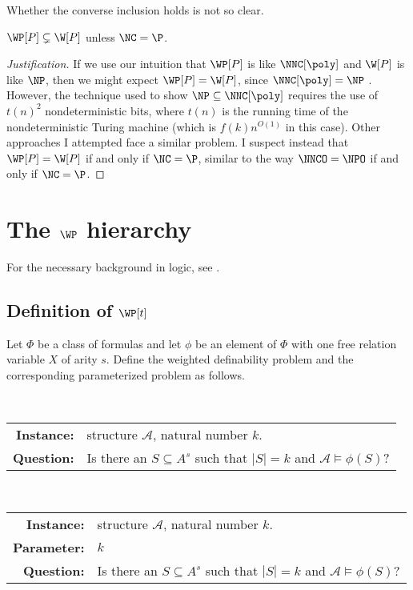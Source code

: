 \documentclass{article}
\newenvironment{justification}{\begin{proof}[Justification]}{\end{proof}}
\begin{document}
Whether the converse inclusion holds is not so clear.

\begin{conjecture}
  $\WP[P] \subsetneq \W[P]$ unless $\NC = \P$.
\end{conjecture}
\begin{justification}
  If we use our intuition that $\WP[P]$ is like $\NNC[\poly]$ and $\W[P]$ is like $\NP$, then we might expect $\WP[P] = \W[P]$, since $\NNC[\poly] = \NP$ \autocite[Theorem~2.2]{wolf94}.
  However, the technique used to show $\NP \subseteq \NNC[\poly]$ requires the use of $t(n)^2$ nondeterministic bits, where $t(n)$ is the running time of the nondeterministic Turing machine (which is $f(k) n^{O(1)}$ in this case).
  Other approaches I attempted face a similar problem.
  I suspect instead that $\WP[P] = \W[P]$ if and only if $\NC = \P$, similar to the way $\NNCO = \NPO$ \autocite{ncapproximation} if and only if $\NC = \P$.
\end{justification}

\section{The \texorpdfstring{$\WP$}{WP} hierarchy}

For the necessary background in logic, see \autocite[Chapter~4]{fg06}.

\subsection{Definition of \texorpdfstring{$\WP[t]$}{WP[t]}}

Let $\Phi$ be a class of formulas and let $\phi$ be an element of $\Phi$ with one free relation variable $X$ of arity $s$.
Define the weighted definability problem and the corresponding parameterized problem as follows.

\begin{definition}
  \mbox{} \\
  \begin{tabular}{r p{9.2cm}}
    \textbf{Instance:} & structure $\mathcal{A}$, natural number $k$. \\
    \textbf{Question:} & Is there an $S \subseteq A^s$ such that $|S| = k$ and $\mathcal{A} \models \phi(S)$?
  \end{tabular}
\end{definition}

\begin{definition}
  \mbox{} \\
  \begin{tabular}{r p{9.2cm}}
    \textbf{Instance:} & structure $\mathcal{A}$, natural number $k$. \\
    \textbf{Parameter:} & $k$ \\
    \textbf{Question:} & Is there an $S \subseteq A^s$ such that $|S| = k$ and $\mathcal{A} \models \phi(S)$?
  \end{tabular}
\end{definition}
\end{document}
